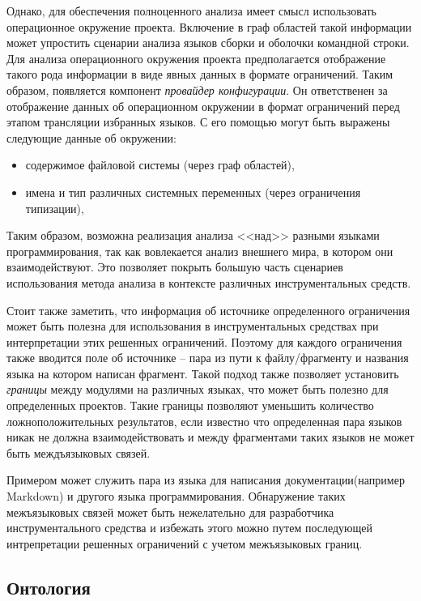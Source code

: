 Однако, для обеспечения полноценного анализа имеет смысл использовать операционное окружение
проекта. Включение в граф областей такой информации может упростить сценарии анализа
языков сборки и оболочки командной строки.
Для анализа операционного окружения проекта предполагается отображение такого рода информации в виде
явных данных в формате ограничений. Таким образом, появляется компонент \textit{провайдер конфигурации}.
Он ответственен за отображение данных об операционном окружении в формат ограничений перед
этапом трансляции избранных языков. С его помощью могут быть выражены следующие данные об окружении:
\begin{itemize}
    \item содержимое файловой системы (через граф областей),
    \item имена и тип различных системных переменных (через ограничения типизации),
\end{itemize}

Таким образом, возможна реализация анализа <<над>> разными языками программирования, так как
 вовлекается анализ внешнего мира, в котором они взаимодействуют. Это позволяет
 покрыть большую часть сценариев использования метода анализа в контексте различных
 инструментальных средств. 

Стоит также заметить, что информация об источнике определенного ограничения может быть полезна для использования
в инструментальных средствах при интерпретации этих решенных ограничений. Поэтому для каждого ограничения также вводится
поле об источнике -- пара из пути к файлу/фрагменту и названия языка на котором написан фрагмент. Такой
подход также позволяет установить \textit{границы} между модулями на различных языках, что может быть полезно
для определенных проектов. Такие границы позволяют уменьшить количество ложноположительных результатов, если
известно что определенная пара языков никак не должна взаимодействовать и между фрагментами таких языков не может быть
междъязыковых связей. 

Примером может служить пара из языка для написания документации(например Markdown) и другого языка программирования.
Обнаружение таких межъязыковых связей может быть нежелательно для разработчика инструментального средства и
избежать этого можно путем последующей интрепретации решенных ограничений с учетом межъязыковых границ.

\subsection{Онтология} \label{ssec:ontology}

